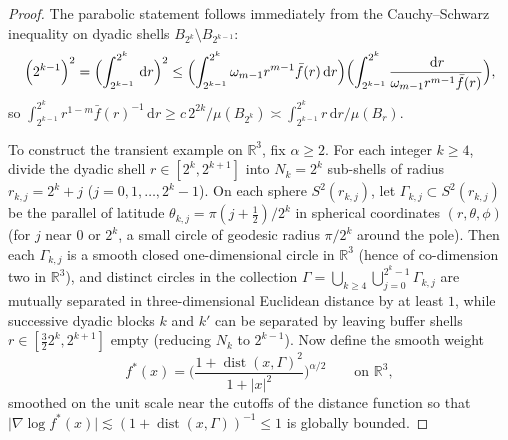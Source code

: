 \documentclass[a4paper,11pt,noarxiv]{quantumarticle}
\newcommand{\R}{\mathbb{R}}
\newcommand{\abs}[1]{\lvert #1\rvert}
\newcommand{\dd}{\,\mathrm{d}}
\newcommand{\grad}{\nabla}
\newcommand{\fbar}{\bar f}
\DeclareMathOperator{\dist}{dist}
\theoremstyle{plain}
\theoremstyle{definition}
\theoremstyle{remark}
\begin{document}
\begin{proof}
The parabolic statement follows immediately from the Cauchy--Schwarz
inequality on dyadic shells $B_{2^k}\setminus B_{2^{k-1}}$:
\[
\Bigl(2^{k-1}\Bigr)^2
=\Bigl(\int_{2^{k-1}}^{2^k}\dd r\Bigr)^2
\le\Bigl(\int_{2^{k-1}}^{2^k}\omega_{m-1}r^{m-1}\fbar(r)\dd r\Bigr)
\Bigl(\int_{2^{k-1}}^{2^k}\frac{\dd r}{\omega_{m-1}r^{m-1}\fbar(r)}\Bigr),
\]
so $\int_{2^{k-1}}^{2^k}r^{1-m}\fbar(r)^{-1}\dd r\ge c\,2^{2k}/\mu(B_{2^k})
\asymp\int_{2^{k-1}}^{2^k}r\dd r/\mu(B_r)$.

To construct the transient example on $\R^3$, fix $\alpha\ge2$. For each
integer $k\ge4$, divide the dyadic shell $r\in[2^k,2^{k+1}]$ into
$N_k=2^k$ sub-shells of radius $r_{k,j}=2^k+j$ ($j=0,1,\dots,2^k-1$). On
each sphere $S^2(r_{k,j})$, let $\Gamma_{k,j}\subset S^2(r_{k,j})$ be the
parallel of latitude $\theta_{k,j}=\pi(j+\tfrac12)/2^k$ in spherical
coordinates $(r,\theta,\phi)$ (for $j$ near $0$ or $2^k$, a small circle
of geodesic radius $\pi/2^k$ around the pole). Then each $\Gamma_{k,j}$
is a smooth closed one-dimensional circle in $\R^3$ (hence of
co-dimension two in $\R^3$), and distinct circles in the collection
$\Gamma=\bigcup_{k\ge4}\bigcup_{j=0}^{2^k-1}\Gamma_{k,j}$ are mutually
separated in three-dimensional Euclidean distance by at least $1$, while
successive dyadic blocks $k$ and $k'$ can be separated by leaving buffer
shells $r\in[\tfrac32 2^k,2^{k+1}]$ empty (reducing $N_k$ to $2^{k-1}$).
Now define the smooth weight
\begin{equation}\label{eq:ring_weight}
f^*(x)=\biggl(\frac{1+\dist(x,\Gamma)^2}{1+\abs{x}^2}\biggr)^{\alpha/2}
\qquad\text{on }\R^3,
\end{equation}
smoothed on the unit scale near the cutoffs of the distance function so
that $\abs{\grad\log f^*(x)}\lesssim(1+\dist(x,\Gamma))^{-1}\le1$ is
globally bounded.


\end{proof}
\end{document}
